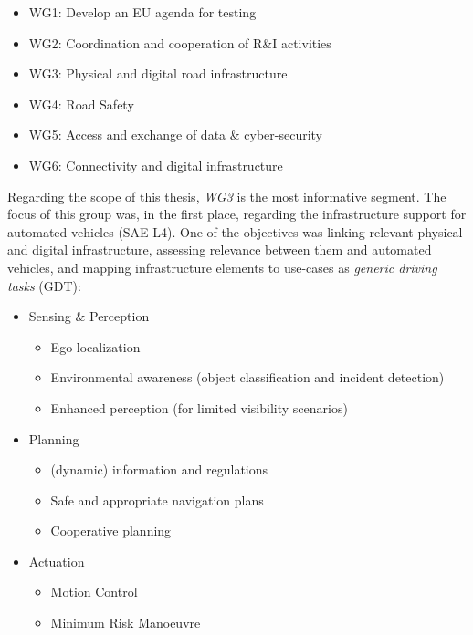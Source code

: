 \documentclass[main.tex]{subfiles}
\begin{document}
\begin{itemize}
    \item WG1: Develop an EU agenda for testing
    \item WG2: Coordination and cooperation of R\&I activities
    \item WG3: Physical and digital road infrastructure
    \item WG4: Road Safety
    \item WG5: Access and exchange of data \& cyber-security
    \item WG6: Connectivity and digital infrastructure
\end{itemize}

Regarding the scope of this thesis, \emph{WG3} is the most informative segment. The focus of this group 
was, in the first place, regarding the infrastructure support for automated vehicles (SAE L4). One of 
the objectives was linking relevant physical and digital infrastructure, assessing relevance between 
them and automated vehicles, and mapping infrastructure elements to use-cases as \emph{generic driving 
tasks} (GDT):

\begin{itemize}
    \item Sensing \& Perception
    \begin{itemize}
        \item Ego localization
        \item Environmental awareness (object classification and incident detection)
        \item Enhanced perception (for limited visibility scenarios)
    \end{itemize}
    \item Planning
    \begin{itemize}
        \item (dynamic) information and regulations
        \item Safe and appropriate navigation plans
        \item Cooperative planning
    \end{itemize}
    \item Actuation
    \begin{itemize}
        \item Motion Control
        \item Minimum Risk Manoeuvre
    \end{itemize}
\end{itemize}
\end{document}
